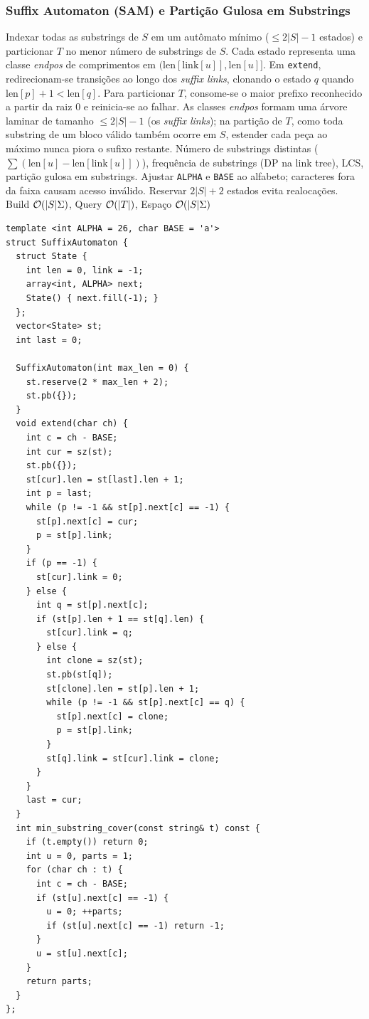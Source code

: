 \subsubsection{Suffix Automaton (SAM) e Partição Gulosa em Substrings}
\algobox
  {Indexar todas as substrings de $S$ em um autômato mínimo ($\le 2|S|-1$ estados) e particionar $T$ no menor número de substrings de $S$.}
  {Cada estado representa uma classe \emph{endpos} de comprimentos em $(\text{len}[\text{link}[u]], \text{len}[u]]$. Em \texttt{extend}, redirecionam-se transições ao longo dos \emph{suffix links}, clonando o estado $q$ quando $\text{len}[p] + 1 < \text{len}[q]$. Para particionar $T$, consome-se o maior prefixo reconhecido a partir da raiz $0$ e reinicia-se ao falhar.}
  {As classes \emph{endpos} formam uma árvore laminar de tamanho $\le 2|S|-1$ (os \emph{suffix links}); na partição de $T$, como toda substring de um bloco válido também ocorre em $S$, estender cada peça ao máximo nunca piora o sufixo restante.}
  {Número de substrings distintas ($\sum (\text{len}[u] - \text{len}[\text{link}[u]])$), frequência de substrings (DP na link tree), LCS, partição gulosa em substrings.}
  {Ajustar \texttt{ALPHA} e \texttt{BASE} ao alfabeto; caracteres fora da faixa causam acesso inválido. Reservar $2|S| + 2$ estados evita realocações.}
  {Build $\mathcal{O}(|S|\Sigma)$, Query $\mathcal{O}(|T|)$, Espaço $\mathcal{O}(|S|\Sigma)$}

\begin{lstlisting}
template <int ALPHA = 26, char BASE = 'a'>
struct SuffixAutomaton {
  struct State {
    int len = 0, link = -1;
    array<int, ALPHA> next;
    State() { next.fill(-1); }
  };
  vector<State> st;
  int last = 0;

  SuffixAutomaton(int max_len = 0) {
    st.reserve(2 * max_len + 2);
    st.pb({});
  }
  void extend(char ch) {
    int c = ch - BASE;
    int cur = sz(st);
    st.pb({});
    st[cur].len = st[last].len + 1;
    int p = last;
    while (p != -1 && st[p].next[c] == -1) {
      st[p].next[c] = cur;
      p = st[p].link;
    }
    if (p == -1) {
      st[cur].link = 0;
    } else {
      int q = st[p].next[c];
      if (st[p].len + 1 == st[q].len) {
        st[cur].link = q;
      } else {
        int clone = sz(st);
        st.pb(st[q]);
        st[clone].len = st[p].len + 1;
        while (p != -1 && st[p].next[c] == q) {
          st[p].next[c] = clone;
          p = st[p].link;
        }
        st[q].link = st[cur].link = clone;
      }
    }
    last = cur;
  }
  int min_substring_cover(const string& t) const {
    if (t.empty()) return 0;
    int u = 0, parts = 1;
    for (char ch : t) {
      int c = ch - BASE;
      if (st[u].next[c] == -1) {
        u = 0; ++parts;
        if (st[u].next[c] == -1) return -1;
      }
      u = st[u].next[c];
    }
    return parts;
  }
};
\end{lstlisting}

